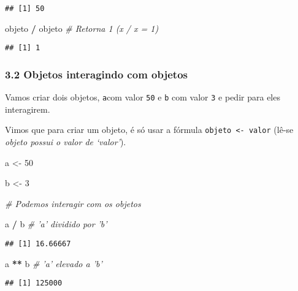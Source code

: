 \documentclass[
]{article}
\newenvironment{Shaded}{\begin{snugshade}}{\end{snugshade}}
\newcommand{\CommentTok}[1]{\textcolor[rgb]{0.56,0.35,0.01}{\textit{#1}}}
\newcommand{\DecValTok}[1]{\textcolor[rgb]{0.00,0.00,0.81}{#1}}
\newcommand{\NormalTok}[1]{#1}
\newcommand{\OperatorTok}[1]{\textcolor[rgb]{0.81,0.36,0.00}{\textbf{#1}}}
\newcommand{\StringTok}[1]{\textcolor[rgb]{0.31,0.60,0.02}{#1}}
\begin{document}
\begin{verbatim}
## [1] 50
\end{verbatim}

\begin{Shaded}
\begin{Highlighting}[]
\NormalTok{objeto }\OperatorTok{/}\StringTok{ }\NormalTok{objeto }\CommentTok{# Retorna 1 (x / x = 1)}
\end{Highlighting}
\end{Shaded}

\begin{verbatim}
## [1] 1
\end{verbatim}

\hypertarget{objetos-interagindo-com-objetos}{%
\subsubsection{3.2 Objetos interagindo com
objetos}\label{objetos-interagindo-com-objetos}}

Vamos criar dois objetos, \texttt{a}com valor \texttt{50} e \texttt{b}
com valor \texttt{3} e pedir para eles interagirem.

Vimos que para criar um objeto, é só usar a fórmula
\texttt{objeto\ \textless{}-\ valor} (lê-se \emph{objeto possui o valor
de `valor'}).

\begin{Shaded}
\begin{Highlighting}[]
\NormalTok{a <-}\StringTok{ }\DecValTok{50}

\NormalTok{b <-}\StringTok{ }\DecValTok{3}

\CommentTok{# Podemos interagir com os objetos}

\NormalTok{a }\OperatorTok{/}\StringTok{ }\NormalTok{b   }\CommentTok{# 'a' dividido por 'b'}
\end{Highlighting}
\end{Shaded}

\begin{verbatim}
## [1] 16.66667
\end{verbatim}

\begin{Shaded}
\begin{Highlighting}[]
\NormalTok{a }\OperatorTok{**}\StringTok{ }\NormalTok{b  }\CommentTok{# 'a' elevado a 'b'}
\end{Highlighting}
\end{Shaded}

\begin{verbatim}
## [1] 125000
\end{verbatim}
\end{document}
